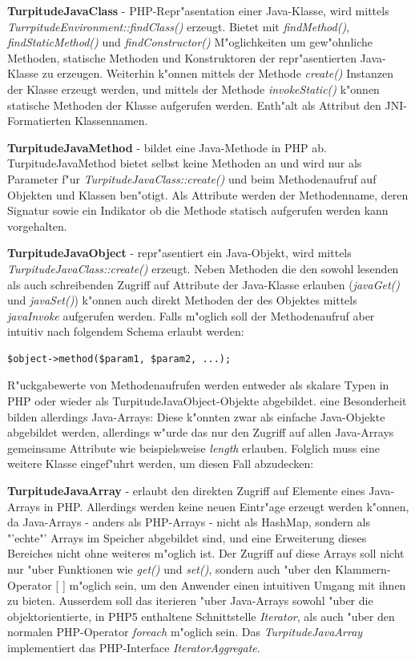 \textbf{TurpitudeJavaClass} - PHP-Repr"asentation einer Java-Klasse, wird mittels \emph{TurrpitudeEnvironment::findClass()} erzeugt.
Bietet mit \emph{findMethod()}, \emph{findStaticMethod()} und \emph{findConstructor()} M"oglichkeiten um gew"ohnliche Methoden, statische
Methoden und Konstruktoren der repr"asentierten Java-Klasse zu erzeugen. Weiterhin k"onnen mittels der Methode \emph{create()} Instanzen
der Klasse erzeugt werden, und mittels der Methode \emph{invokeStatic()} k"onnen statische Methoden der Klasse aufgerufen werden.
Enth"alt als Attribut den JNI-Formatierten Klassennamen. 

\textbf{TurpitudeJavaMethod} - bildet eine Java-Methode in PHP ab. TurpitudeJavaMethod bietet selbst keine Methoden an und wird nur
als Parameter f"ur \emph{TurpitudeJavaClass::create()} und beim Methodenaufruf auf Objekten und Klassen ben"otigt.
Als Attribute werden der Methodenname, deren Signatur sowie ein Indikator ob die Methode statisch aufgerufen werden kann vorgehalten.

\textbf{TurpitudeJavaObject} - repr"asentiert ein Java-Objekt, wird mittels \emph{TurpitudeJavaClass::create()} erzeugt. Neben Methoden
die den sowohl lesenden als auch schreibenden Zugriff auf Attribute der Java-Klasse erlauben (\emph{javaGet()} und \emph{javaSet()}) k"onnen
auch direkt Methoden der des Objektes mittels \emph{javaInvoke} aufgerufen werden. Falls m"oglich soll der Methodenaufruf aber
intuitiv nach folgendem Schema erlaubt werden:
\begin{lstlisting}[caption=angestrebte Syntax zum Aufruf von Java-Methoden in PHP]
$object->method($param1, $param2, ...);
\end{lstlisting}
R"uckgabewerte von Methodenaufrufen werden entweder als skalare Typen in PHP oder wieder als TurpitudeJavaObject-Objekte abgebildet.
eine Besonderheit bilden allerdings Java-Arrays: Diese k"onnten zwar als einfache Java-Objekte abgebildet werden, allerdings w"urde das 
nur den Zugriff auf allen Java-Arrays gemeinsame Attribute wie beispielsweise \emph{length} erlauben. Folglich muss eine weitere
Klasse eingef"uhrt werden, um diesen Fall abzudecken:

\textbf{TurpitudeJavaArray} - erlaubt den direkten Zugriff auf Elemente eines Java-Arrays in PHP. Allerdings werden keine neuen Eintr"age
erzeugt werden k"onnen, da Java-Arrays - anders als PHP-Arrays - nicht als HashMap, sondern als "'echte"' Arrays im Speicher abgebildet
sind, und eine Erweiterung dieses Bereiches nicht ohne weiteres m"oglich ist. Der Zugriff auf diese Arrays soll nicht nur "uber 
Funktionen wie \emph{get()} und \emph{set()}, sondern auch "uber den Klammern-Operator [ ] m"oglich sein, um den Anwender einen
intuitiven Umgang mit ihnen zu bieten. Ausserdem soll das iterieren "uber Java-Arrays sowohl "uber die objektorientierte, in PHP5
enthaltene Schnittstelle \emph{Iterator}, als auch "uber den normalen PHP-Operator \emph{foreach} m"oglich sein. Das
\emph{TurpitudeJavaArray} implementiert das PHP-Interface \emph{IteratorAggregate}.

